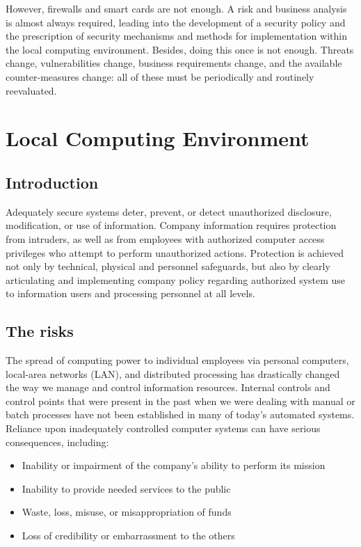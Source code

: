 However, firewalls and smart cards are not enough. A risk and business
analysis is almost always required, leading into the development of a
security policy and the prescription of security mechanisms and methods
for implementation within the local computing environment. Besides,
doing this once is not enough. Threats change, vulnerabilities change,
business requirements change, and the available counter-measures
change: all of these must be periodically and routinely reevaluated.\\


\section{Local Computing Environment}

\subsection{Introduction}
Adequately secure systems deter, prevent, or detect unauthorized
disclosure, modification, or use of information. Company information
requires protection from intruders, as well as from employees with
authorized computer access privileges who attempt to perform
unauthorized actions. Protection is achieved not only by technical,
physical and personnel safeguards, but also by clearly articulating and
implementing company policy regarding authorized system use to
information users and processing personnel at all levels.

\subsection{The risks}
The spread of computing power to individual employees via personal
computers, local-area networks (LAN), and distributed processing has
drastically changed the way we manage and control information
resources. Internal controls and control points that were present in
the past when we were dealing with manual or batch processes have not
been established in many of today's automated systems. Reliance upon
inadequately controlled computer systems can have serious consequences,
including:

\begin{itemize}
  \item Inability or impairment of the company's ability to perform its
    mission
  \item Inability to provide needed services to the public
  \item Waste, loss, misuse, or misappropriation of funds
  \item Loss of credibility or embarrassment to the others
\end{itemize}

